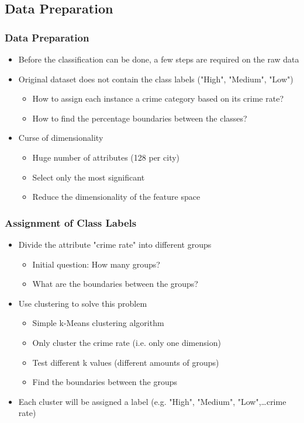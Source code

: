 \mode*

\begin{frame}
	\section{Data Preparation}
	\frametitle{Data Preparation}
        \begin{itemize}
          \item Before the classification can be done, a few steps are required on the raw data
          \item Original dataset does not contain the class labels ("High", "Medium", "Low")
            \begin{itemize}
              \item How to assign each instance a crime category based on its crime rate?
              \item How to find the percentage boundaries between the classes?
            \end{itemize}
          \item Curse of dimensionality
            \begin{itemize}
              \item Huge number of attributes (128 per city)
              \item Select only the most significant
              \item Reduce the dimensionality of the feature space
            \end{itemize}
        \end{itemize}
\end{frame}

\begin{frame}
  \frametitle{Assignment of Class Labels}
  \begin{itemize}
    \item Divide the attribute "crime rate" into different groups
      \begin{itemize}
        \item Initial question: How many groups?
        \item What are the boundaries between the groups?
      \end{itemize}
    \item Use clustering to solve this problem
      \begin{itemize}
        \item Simple k-Means clustering algorithm
        \item Only cluster the crime rate (i.e. only one dimension)
        \item Test different k values (different amounts of groups)
        \item Find the boundaries between the groups
      \end{itemize}
    \item Each cluster will be assigned a label (e.g. "High", "Medium", "Low",\ldots crime rate)
  \end{itemize}
\end{frame}

